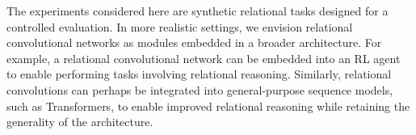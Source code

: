 The experiments considered here are synthetic relational tasks designed for a controlled evaluation. In more realistic settings, we envision relational convolutional networks as modules embedded in a broader architecture. For example, a relational convolutional network can be embedded into an RL agent to enable performing tasks involving relational reasoning. Similarly, relational convolutions can perhaps be integrated into general-purpose sequence models, such as Transformers, to enable improved relational reasoning while retaining the generality of the architecture.